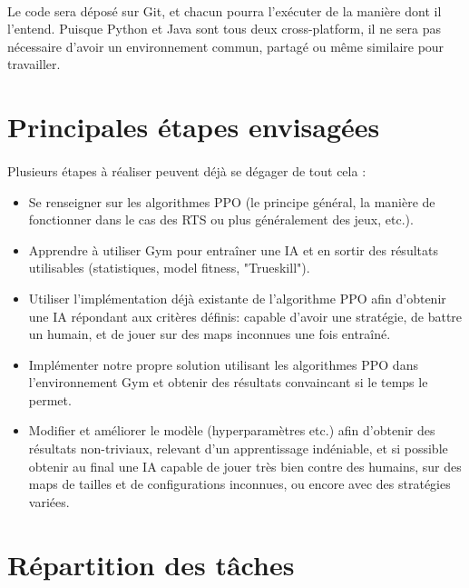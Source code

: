 \documentclass[french]{article}
\begin{document}
	\paragraph*{}
	Le code sera déposé sur Git, et chacun pourra l'exécuter de la manière dont il l'entend. Puisque Python et Java sont tous deux cross-platform, il ne sera pas nécessaire d'avoir un environnement commun, partagé ou même similaire pour travailler.
	
	
	\section{Principales étapes envisagées}
	\paragraph*{}
	Plusieurs étapes à réaliser peuvent déjà se dégager de tout cela :
	\vspace{2mm}
	
	\begin{itemize}
		\item Se renseigner sur les algorithmes PPO  (le principe général, la manière de fonctionner dans le cas des RTS ou plus généralement des jeux, etc.).
		\vspace{2mm}
		\item Apprendre à utiliser Gym pour entraîner une IA et en sortir des résultats utilisables (statistiques, model fitness, "Trueskill").
		\vspace{2mm}
		\item Utiliser l'implémentation déjà existante de l'algorithme PPO afin d'obtenir une IA répondant aux critères définis: capable d'avoir une stratégie, de battre un humain, et de jouer sur des maps inconnues une fois entraîné.
		\vspace{2mm}
		\item Implémenter notre propre solution utilisant les algorithmes PPO dans l'environnement Gym et obtenir des résultats convaincant si le temps le permet.
		\vspace{2mm}
		\item Modifier et améliorer le modèle (hyperparamètres etc.) afin d'obtenir des résultats non-triviaux, relevant d'un apprentissage indéniable, et si possible obtenir au final une IA capable de jouer très bien contre des humains, sur des maps de tailles et de configurations inconnues, ou encore avec des stratégies variées.
	\end{itemize}
	
	\section{Répartition des tâches}
	
\end{document}
